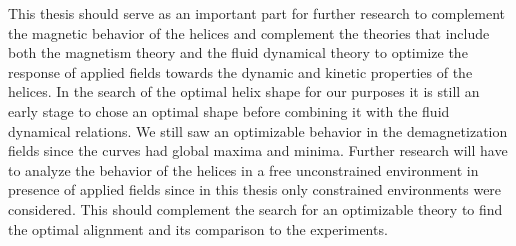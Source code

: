 This thesis should serve as an important part for further research to complement the magnetic behavior of the helices and complement the theories that include both the magnetism theory and the fluid dynamical theory to optimize the response of applied fields towards the dynamic and kinetic properties of the helices. In the search of the optimal helix shape for our purposes it is still an early stage to chose an optimal shape before combining it with the fluid dynamical relations. We still saw an optimizable behavior in the demagnetization fields since the curves had global maxima and minima. Further research will have to analyze the behavior of the helices in a free unconstrained environment in presence of applied fields since in this thesis only constrained environments were considered. This should complement the search for an optimizable theory to find the optimal alignment and its comparison to the experiments.
